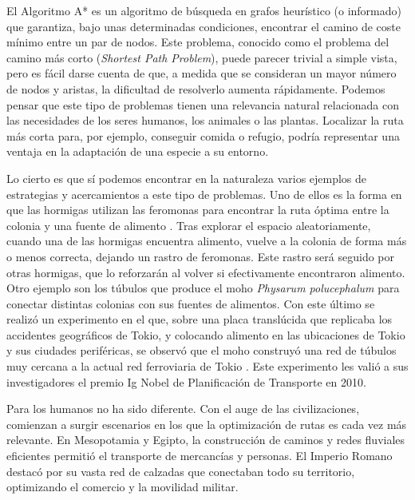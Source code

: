\documentclass[a4paper,12pt]{article}
\begin{document}
El Algoritmo A* es un algoritmo de búsqueda en grafos heurístico (o informado) que garantiza, bajo unas determinadas condiciones, encontrar el camino de coste mínimo entre un par de nodos. Este problema, conocido como el problema del camino más corto (\textit{Shortest Path Problem}), puede parecer trivial a simple vista, pero es fácil darse cuenta de que, a medida que se consideran un mayor número de nodos y aristas, la dificultad de resolverlo aumenta rápidamente. Podemos pensar que este tipo de problemas tienen una relevancia natural relacionada con las necesidades de los seres humanos, los animales o las plantas. Localizar la ruta más corta para, por ejemplo, conseguir comida o refugio, podría representar una ventaja en la adaptación de una especie a su entorno.

Lo cierto es que sí podemos encontrar en la naturaleza varios ejemplos de estrategias y acercamientos a este tipo de problemas. Uno de ellos es la forma en que las hormigas utilizan las feromonas para encontrar la ruta óptima entre la colonia y una fuente de alimento \cite{colorni1991distributed}. Tras explorar el espacio aleatoriamente, cuando una de las hormigas encuentra alimento, vuelve a la colonia de forma más o menos correcta, dejando un rastro de feromonas. Este rastro será seguido por otras hormigas, que lo reforzarán al volver si efectivamente encontraron alimento. Otro ejemplo son los túbulos que produce el moho \textit{Physarum polucephalum} para conectar distintas colonias con sus fuentes de alimentos. Con este último se realizó un experimento en el que, sobre una placa translúcida que replicaba los accidentes geográficos de Tokio, y colocando alimento en las ubicaciones de Tokio y sus ciudades periféricas, se observó que el moho construyó una red de túbulos muy cercana a la actual red ferroviaria de Tokio \cite{tero2010rules}. Este experimento les valió a sus investigadores el premio Ig Nobel de Planificación de Transporte en 2010.

Para los humanos no ha sido diferente. Con el auge de las civilizaciones, comienzan a surgir escenarios en los que la optimización de rutas es cada vez más relevante. En Mesopotamia y Egipto, la construcción de caminos y redes fluviales eficientes permitió el transporte de mercancías y personas. El Imperio Romano destacó por su vasta red de calzadas que conectaban todo su territorio, optimizando el comercio y la movilidad militar.
\end{document}
